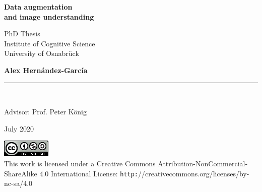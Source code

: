 {
\begin{titlepage}

    \begin{center}

	\Huge{\textbf{Data augmentation\\and image understanding}} \\
	
	\vspace{4.0cm}
	
	\Large{%
    PhD Thesis\\
    Institute of Cognitive Science\\
    University of Osnabrück}\\
	\vspace{2.0cm}
	
	\Large{\textbf{Alex Hern\'andez-Garc\'ia}} \\
	
	\vspace*{0.2cm}
	\rule{80mm}{0.1mm} \\ %
	\vspace*{0.1cm}
      
	\large{Advisor: Prof. Peter K\"onig} \\
      
	\vspace{0.5cm}

	\large{July 2020}

    \vspace{7.0cm}

    \includegraphics[width= 0.2 \linewidth]{includes/cover/img/license.png}\\\vspace{0.5cm}
    \footnotesize{This work is licensed under a Creative Commons Attribution-NonCommercial-ShareAlike 4.0 International License: \texttt{http:}//creativecommons.org/licenses/by-nc-sa/4.0}
    \end{center}
  
\end{titlepage}
\cleardoublepage
}
